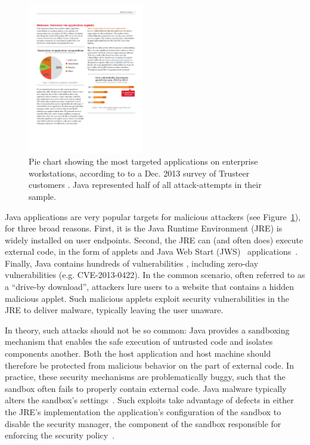 \documentclass{sig-alternate}
\begin{document}
\begin{figure}
\begin{centering}
\includegraphics[width=2in]{most_targeted_apps_ibm_xforce}
\par\end{centering}
\caption{Pie chart showing the most
targeted applications on enterprise workstations, according to to
a Dec. 2013 survey of Trusteer customers \cite{xforceQ12013}. Java
\label{fig:most-targeted-applications}represented half of all attack-attempts in their sample.}
\end{figure}

Java applications are very popular targets for malicious attackers (see
Figure~\ref{fig:most-targeted-applications}), for three broad reasons.  First,
it is the Java Runtime Environment (JRE) is widely installed on user endpoints.
Second, the JRE can (and often does) execute external code, in the form of
applets and Java Web Start (JWS)~\cite{_java_web_start}
applications~\cite{gong1997going,gong2003inside}.  Finally, Java contains
hundreds of vulnerabilities , including zero-day vulnerabilities (e.g. CVE-2013-0422).  In the
common scenario, often referred to as a ``drive-by download'', attackers lure
users to a website that contains a hidden malicious applet. Such malicious
applets exploit security vulnerabilities in the JRE to deliver malware,
typically leaving the user unaware.

In theory, such attacks should not be so common: 
Java provides a sandboxing mechanism that enables the safe execution of untrusted code and isolates
components another. Both the host application and host machine should
therefore be protected from malicious behavior on the part of
external code.  In practice, these security mechanisms are problematically
buggy, such that the sandbox often fails to properly contain external code. 
Java malware typically alters the sandbox's
settings~\cite{garber_2012}.  Such exploits take advantage of defects in either
the JRE's implementation the application's configuration of the sandbox to 
disable the security manager, the component of the sandbox responsible for enforcing the
security policy~\cite{fireeye_2013,svoboda_anatomy_blog_2013,security_explorations_2012,blackhat_2012}.
\end{document}
